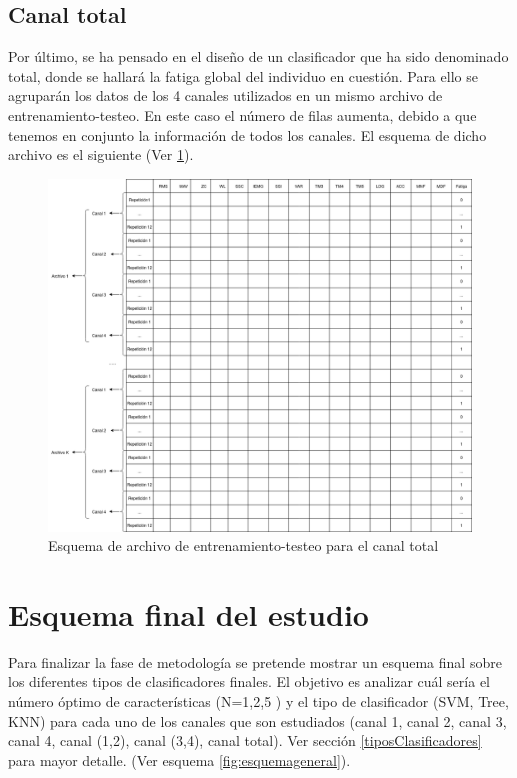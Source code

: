     
    
    \subsection{Canal total}
    Por último, se ha pensado en el diseño de un clasificador que ha sido denominado total, donde se hallará la fatiga global del individuo en cuestión. Para ello se agruparán los datos de los 4 canales utilizados en un mismo archivo de entrenamiento-testeo. En este caso el número de filas aumenta, debido a que tenemos en conjunto la información de todos los canales. El esquema de dicho archivo es el siguiente (Ver \ref{fig:canaltotal}).


    \begin{figure}[ht]
    \centering
    \includegraphics[scale=0.28]{imagenes/canal total.png}
    \caption{ Esquema de archivo de entrenamiento-testeo para el canal total }
    \label{fig:canaltotal}
    \end{figure}

    
        \newpage
    
\section{Esquema final del estudio}
Para finalizar la fase de metodología se pretende mostrar un esquema final sobre los diferentes tipos de clasificadores finales. El objetivo es analizar cuál sería el número óptimo de características (N=1,2,5 ) y el tipo de clasificador (SVM, Tree, KNN) para cada uno de los canales que son estudiados (canal 1, canal 2, canal 3, canal 4, canal (1,2), canal (3,4), canal total). Ver sección \ref{tiposClasificadores} para mayor detalle. (Ver esquema \ref{fig:esquemageneral}).




